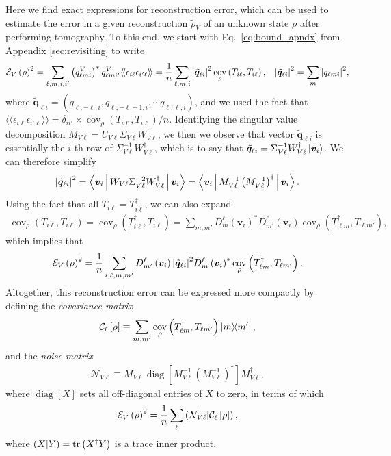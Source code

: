 \documentclass[notitlepage,twocolumn]{revtex4-2}
\newcommand{\f}[2]{\dfrac{#1}{#2}} %
\newcommand{\p}[1]{\left(#1\right)} %
\renewcommand{\sp}[1]{\left[#1\right]} %
\newcommand{\bk}{\Braket} %
\renewcommand{\v}{\bm} %
\newcommand{\bbk}[1]{\langle\!\langle #1 \rangle\!\rangle}
\newcommand{\C}{\mathcal{C}}
\newcommand{\E}{\mathcal{E}}
\newcommand{\N}{\mathcal{N}}
\def\obk#1{\mathinner{({#1})}}
\DeclareMathOperator{\cov}{cov}
\DeclareMathOperator{\diag}{diag}
\begin{document}
Here we find exact expressions for reconstruction error, which can be used to estimate the error in a given reconstruction $\tilde\rho_V$ of an unknown state $\rho$ after performing tomography.
To this end, we start with Eq.~\eqref{eq:bound_apndx} from Appendix \ref{sec:revisiting} to write
\begin{align}
  \E_V\p{\rho}^2
  = \sum_{\ell,m,i,i'} \p{q^V_{\ell mi}}^* q^V_{\ell mi'} \bbk{\epsilon_{i\ell}\epsilon_{i'\ell}}
  = \f1n \sum_{\ell,m,i} \abs{\tilde{\v q}_{\ell i}}^2 \cov_\rho\p{T_{i\ell},T_{i\ell}},
  &&
  \abs{\tilde{\v q}_{\ell i}}^2 = \sum_m \abs{q_{\ell mi}}^2,
  \label{eq:error_SM_start}
\end{align}
where $\tilde{\v q}_{\ell i} = (q_{\ell,-\ell,i},q_{\ell,-\ell+1,i},\cdots q_{\ell,\ell,i})$, and we used the fact that $\bbk{\epsilon_{i\ell}\epsilon_{i'\ell}} = \delta_{ii'}\times\cov_\rho\p{T_{i\ell},T_{i\ell}}/n$.
Identifying the singular value decomposition $M_{V\ell} = U_{V\ell} \Sigma_{V\ell} W_{V\ell}^\dag$, we then we observe that vector $\tilde{\v q}_{\ell i}$ is essentially the $i$-th row of $\Sigma_{V\ell}^{-1} W_{V\ell}^\dag$, which is to say that $\tilde{\v q}_{\ell i} = \Sigma_{V\ell}^{-1} W_{V\ell}^\dag \ket{\v v_i}$.
We can therefore simplify
\begin{align}
  \abs{\tilde{\v q}_{\ell i}}^2
  = \bk{\v v_i | W_{V\ell} \Sigma_{V\ell}^{-2} W_{V\ell}^\dag | \v v_i}
  = \bk{\v v_i| M_{V\ell}^{-1} \p{M_{V\ell}^{-1}}^\dag | \v v_i}.
\end{align}
Using the fact that all $T_{i\ell}=T_{i\ell}^\dag$, we can also expand
\begin{align}
  \cov_\rho\p{T_{i\ell},T_{i\ell}}
  = \cov_\rho\p{T_{i\ell}^\dag,T_{i\ell}}
  = \sum_{m,m'} D^\ell_m\p{\v v_i}^* D^\ell_{m'}\p{\v v_i}
  \cov_\rho\p{T_{\ell m}^\dag, T_{\ell m'}},
\end{align}
which implies that
\begin{align}
  \E_V\p{\rho}^2
  = \f1n \sum_{i,\ell,m,m'}
  D^\ell_{m'}\p{\v v_i} \abs{\tilde{\v q}_{\ell i}}^2
  D^\ell_m\p{\v v_i}^*
  \cov_\rho\p{T_{\ell m}^\dag, T_{\ell m'}}.
\end{align}
Altogether, this reconstruction error can be expressed more compactly by defining the {\it covariance matrix}
\begin{align}
  \C_\ell\sp{\rho} \equiv
  \sum_{m,m'} \cov_\rho\p{T_{\ell m}^\dag, T_{\ell m'}} \op{m}{m'},
\end{align}
and the {\it noise matrix}
\begin{align}
  \N_{V\ell} \equiv M_{V\ell} \diag\sp{M_{V\ell}^{-1}
    \p{M_{V\ell}^{-1}}^\dag} M_{V\ell}^\dag,
\end{align}
where $\diag\sp{X}$ sets all off-diagonal entries of $X$ to zero, in terms of which
\begin{align}
  \E_V\p{\rho}^2 = \f1n \sum_\ell \obk{\N_{V\ell}|\C_\ell\sp{\rho}},
  \label{eq:error_SM_mid}
\end{align}
where $\obk{X|Y}=\tr\p{X^\dag Y}$ is a trace inner product.
\end{document}

